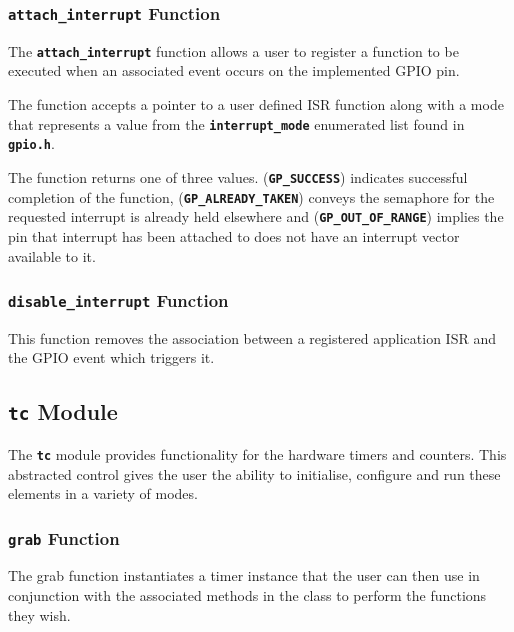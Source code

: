 \documentclass[a4paper, oneside, 11pt, titlepage, onecolumn, openright]{article}
\begin{document}
\subsubsection{\textbf{\texttt{attach\_interrupt}} Function}
			\label{sss:HALattach_interruptFunction}
			
			The \textbf{\texttt{attach\_interrupt}} function allows a user to register a function to be executed when an associated event occurs on the implemented GPIO pin.
			
			The function accepts a pointer to a user defined ISR function along with a mode that represents a value from the \textbf{\texttt{interrupt\_mode}} enumerated list found in \textbf{\texttt{gpio.h}}. 
			
			The function returns one of three values. (\textbf{\texttt{GP\_SUCCESS}}) indicates successful completion of the function, (\textbf{\texttt{GP\_ALREADY\_TAKEN}}) conveys the semaphore for the requested interrupt is already held elsewhere and (\textbf{\texttt{GP\_OUT\_OF\_RANGE}}) implies the pin that interrupt has been attached to does not have an interrupt vector available to it.
			
\subsubsection{\textbf{\texttt{disable\_interrupt}} Function}
			\label{sss:HALdisable_interruptFunction}
			
			This function removes the association between a registered application ISR and the GPIO event which triggers it. 
			
\subsection{\textbf{\texttt{tc}} Module}
			\label{ss:HALtcModule}
			The \textbf{\texttt{tc}} module provides functionality for the hardware timers and counters. This abstracted control gives the user the ability to initialise, configure and run these elements in a variety of modes.
			
\subsubsection{\textbf{\texttt{grab}} Function}
			\label{sss:HALtcgrabFunction}
			The grab function instantiates a timer instance that the user can then use in conjunction with the associated methods in the class to perform the functions they wish.
			
\end{document}

